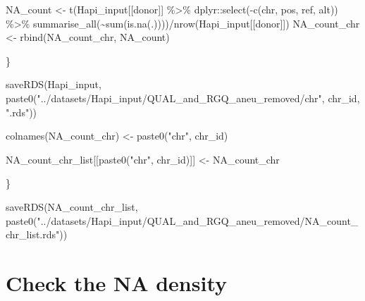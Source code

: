 \documentclass[
  letterpaper,
  DIV=11,
  numbers=noendperiod]{scrreprt}
\newenvironment{Shaded}{\begin{snugshade}}{\end{snugshade}}
\newcommand{\FunctionTok}[1]{\textcolor[rgb]{0.28,0.35,0.67}{#1}}
\newcommand{\NormalTok}[1]{\textcolor[rgb]{0.00,0.23,0.31}{#1}}
\newcommand{\OtherTok}[1]{\textcolor[rgb]{0.00,0.23,0.31}{#1}}
\newcommand{\SpecialCharTok}[1]{\textcolor[rgb]{0.37,0.37,0.37}{#1}}
\newcommand{\StringTok}[1]{\textcolor[rgb]{0.13,0.47,0.30}{#1}}
\begin{document}
\begin{codelisting}
\begin{Shaded}
\begin{Highlighting}[]
\NormalTok{    NA\_count }\OtherTok{\textless{}{-}} \FunctionTok{t}\NormalTok{(Hapi\_input[[donor]] }\SpecialCharTok{\%\textgreater{}\%}\NormalTok{ dplyr}\SpecialCharTok{::}\FunctionTok{select}\NormalTok{(}\SpecialCharTok{{-}}\FunctionTok{c}\NormalTok{(chr, pos, ref, alt)) }\SpecialCharTok{\%\textgreater{}\%} \FunctionTok{summarise\_all}\NormalTok{(}\SpecialCharTok{\textasciitilde{}}\FunctionTok{sum}\NormalTok{(}\FunctionTok{is.na}\NormalTok{(.))))}\SpecialCharTok{/}\FunctionTok{nrow}\NormalTok{(Hapi\_input[[donor]])}
\NormalTok{    NA\_count\_chr }\OtherTok{\textless{}{-}} \FunctionTok{rbind}\NormalTok{(NA\_count\_chr, NA\_count)}
    
\NormalTok{  \}}
  
  \FunctionTok{saveRDS}\NormalTok{(Hapi\_input, }\FunctionTok{paste0}\NormalTok{(}\StringTok{"../datasets/Hapi\_input/QUAL\_and\_RGQ\_aneu\_removed/chr"}\NormalTok{, chr\_id, }\StringTok{".rds"}\NormalTok{))}
  
  \FunctionTok{colnames}\NormalTok{(NA\_count\_chr) }\OtherTok{\textless{}{-}} \FunctionTok{paste0}\NormalTok{(}\StringTok{"chr"}\NormalTok{, chr\_id)}
  
\NormalTok{  NA\_count\_chr\_list[[}\FunctionTok{paste0}\NormalTok{(}\StringTok{"chr"}\NormalTok{, chr\_id)]] }\OtherTok{\textless{}{-}}\NormalTok{ NA\_count\_chr}
  
  
\NormalTok{\}}

\FunctionTok{saveRDS}\NormalTok{(NA\_count\_chr\_list, }\FunctionTok{paste0}\NormalTok{(}\StringTok{"../datasets/Hapi\_input/QUAL\_and\_RGQ\_aneu\_removed/NA\_count\_chr\_list.rds"}\NormalTok{))}
\end{Highlighting}
\end{Shaded}

\end{codelisting}

\hypertarget{check-the-na-density}{%
\section{Check the NA density}\label{check-the-na-density}}
\end{document}
